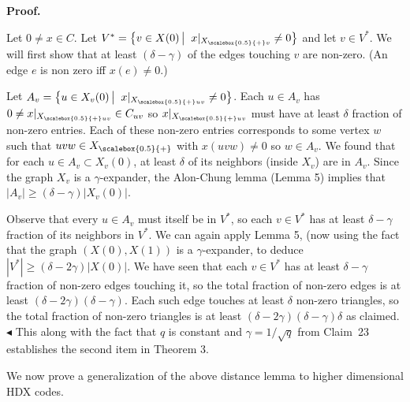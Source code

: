 \documentclass[10pt,a4paper]{article}
\begin{document}



\par\medskip\noindent\textbf{Proof.}\par




Let $0\neq x\in C$.
Let $V^{*}=\left\{v\in X(0)\left|\;\vphantom{v\in X(0)x|_{{X}_{\scalebox{0.5}{+}v}}\neq 0}\right.x|_{{X}_{\scalebox{0.5}{+}v}}\neq 0\right\}$ and let $v\in V^{*}$. We will first show that at least $(\delta-\gamma)$ of the edges touching $v$ are non-zero. (An edge $e$ is non zero iff $x(e)\neq 0$.)\par




Let $A_{v}=\left\{u\in X_{v}(0)\left|\;\vphantom{u\in X_{v}(0)x|_{{X}_{\scalebox{0.5}{+}uv}}\neq 0}\right.x|_{{X}_{\scalebox{0.5}{+}uv}}\neq 0\right\}$. Each $u\in A_{v}$ has $0\neq x|_{{X}_{\scalebox{0.5}{+}uv}}\in C_{uv}$ so $x|_{{X}_{\scalebox{0.5}{+}uv}}$ must have at least $\delta$ fraction of non-zero entries. Each of these non-zero entries corresponds to some vertex $w$ such that $uvw\in{X}_{\scalebox{0.5}{+}}$ with $x(uvw)\neq 0$ so $w\in A_{v}$. We found that for each $u\in A_{v}\subset X_{v}(0)$, at least $\delta$ of its neighbors (inside $X_{v}$) are in $A_{v}$. Since the graph $X_{v}$ is a $\gamma$-expander, the Alon-Chung lemma (Lemma 5) implies that $|A_{v}|\geq(\delta-\gamma)\lvert X_{v}(0)\rvert$.\par




Observe that every $u\in A_{v}$ must itself be in $V^{*}$, so each $v\in V^{*}$ has at least $\delta-\gamma$ fraction of its neighbors in $V^{*}$. We can again apply Lemma 5, (now using the fact that the graph $(X(0),X(1))$ is a $\gamma$-expander, to deduce $|V^{*}|\geq(\delta-2\gamma)|X(0)|$. We have seen that each $v\in V^{*}$ has at least $\delta-\gamma$ fraction of non-zero edges touching it, so the total fraction of non-zero edges is at least $(\delta-2\gamma)(\delta-\gamma)$. Each such edge touches at least $\delta$ non-zero triangles, so the total fraction of non-zero triangles is at least $(\delta-2\gamma)(\delta-\gamma)\delta$ as claimed.
$\blacktriangleleft$
This along with the fact that $q$ is constant and $\gamma=1/\sqrt{q}$ from Claim 23 establishes the second item in Theorem 3.\par




We now prove a generalization of the above distance lemma to higher dimensional HDX codes.\par
\end{document}
